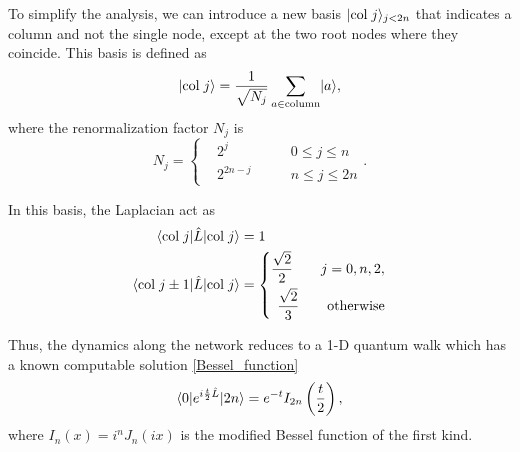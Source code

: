 To simplify the analysis, we can introduce a new basis $\lvert\mathrm{col}\; j\rangle_{j<2n}$ that indicates a column and not the single node, except at the two root nodes where they coincide. This basis is defined as
\begin{equation}
    \lvert\mathrm{col}\; j\rangle = \frac{1}{\sqrt{N_j}}\sum_{a\in \mathrm{column}} \lvert a\rangle, 
\end{equation}
where the renormalization factor $N_j$ is 
\begin{equation}
    N_j = \left\{\begin{aligned}
        &2^j \qquad &0\leq j\leq n\\
        &2^{2n-j} \qquad &n \leq j \leq 2n
    \end{aligned}\right. .
\end{equation}

In this basis, the Laplacian act as
\begin{equation}
    \begin{aligned}
        \langle\mathrm{col}\; j\rvert\hat L \lvert\mathrm{col}\; j\rangle &= 1\\
        \langle\mathrm{col}\; j \pm 1\rvert\hat L \lvert\mathrm{col}\; j\rangle &=\left\{\begin{aligned}
            \frac{\sqrt{2}}{2} \qquad j=0,n,2,\\
            \frac{\sqrt{2}}{3} \qquad \mathrm{otherwise}\\
        \end{aligned}\right.
    \end{aligned}
\end{equation}

Thus, the dynamics along the network reduces to a 1-D quantum walk which has a known computable solution \eqref{Bessel_function} %
\begin{equation}
    \langle0\rvert e^{i\frac{t}{2}\hat L}\lvert2n\rangle = e^{-t} I_{2n}\left(\frac{t}{2}\right),
\end{equation}
where $I_{n}(x) = i^{n}J_{n}(ix)$ is the modified Bessel function of the first kind. 
